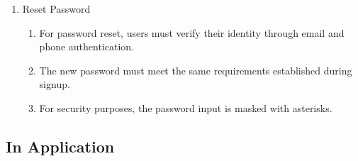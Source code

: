 \documentclass[conference]{IEEEtran}
\begin{document}
\begin{enumerate}[label=\arabic*]
\begin{enumerate}[label=\arabic*)]
        \vspace{0.5em}

        \item Reset Password\par
        \vspace{0.3em}

        \begin{enumerate}[label=\alph*)]
            \item For password reset, users must verify their identity through email and phone authentication.

            \vspace{0.5em}

            \item The new password must meet the same requirements established during signup.

            \vspace{0.5em}

            \item For security purposes, the password input is masked with asterisks.
        \end{enumerate}
    \end{enumerate}
\end{enumerate}

\vspace{0.7em} %

\subsection{In Application}
\vspace{0.5em}
\end{document}
